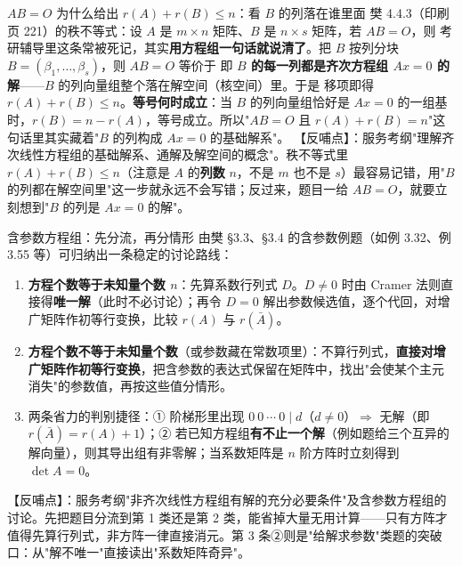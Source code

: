 \begin{fdeep}{$AB=O$ 为什么给出 $r(A)+r(B)\le n$：看 $B$ 的列落在谁里面}
樊 4.4.3（印刷页 221）的秩不等式：设 $A$ 是 $m\times n$ 矩阵、$B$ 是 $n\times s$ 矩阵，若 $AB=O$，则
考研辅导里这条常被死记，其实\textbf{用方程组一句话就说清了}。把 $B$ 按列分块 $B=(\beta_1,\dots,\beta_s)$，则 $AB=O$ 等价于
即 \textbf{$B$ 的每一列都是齐次方程组 $Ax=0$ 的解}——$B$ 的列向量组整个落在解空间（核空间）里。于是
移项即得 $r(A)+r(B)\le n$。\textbf{等号何时成立}：当 $B$ 的列向量组恰好是 $Ax=0$ 的一组基时，$r(B)=n-r(A)$，等号成立。所以"$AB=O$ 且 $r(A)+r(B)=n$"这句话里其实藏着"$B$ 的列构成 $Ax=0$ 的基础解系"。
【反哺点】：服务考纲"理解齐次线性方程组的基础解系、通解及解空间的概念"。秩不等式里 $r(A)+r(B)\le n$（注意是 $A$ 的\textbf{列数} $n$，不是 $m$ 也不是 $s$）最容易记错，用"$B$ 的列都在解空间里"这一步就永远不会写错；反过来，题目一给 $AB=O$，就要立刻想到"$B$ 的列是 $Ax=0$ 的解"。
\end{fdeep}

\begin{fdeep}{含参数方程组：先分流，再分情形}
由樊 §3.3、§3.4 的含参数例题（如例 3.32、例 3.55 等）可归纳出一条稳定的讨论路线：
\begin{enumerate}[leftmargin=2.2em,itemsep=0.25em]
\item \textbf{方程个数等于未知量个数 $n$}：先算系数行列式 $D$。$D\ne0$ 时由 Cramer 法则直接得\textbf{唯一解}（此时不必讨论）；再令 $D=0$ 解出参数候选值，逐个代回，对增广矩阵作初等行变换，比较 $r(A)$ 与 $r(\bar A)$。
\item \textbf{方程个数不等于未知量个数}（或参数藏在常数项里）：不算行列式，\textbf{直接对增广矩阵作初等行变换}，把含参数的表达式保留在矩阵中，找出"会使某个主元消失"的参数值，再按这些值分情形。
\item 两条省力的判别捷径：① 阶梯形里出现 $0\ 0\ \cdots\ 0\mid d$（$d\ne0$）$\Longrightarrow$ 无解（即 $r(\bar A)=r(A)+1$）；② 若已知方程组\textbf{有不止一个解}（例如题给三个互异的解向量），则其导出组有非零解；当系数矩阵是 $n$ 阶方阵时立刻得到 $\det A=0$。
\end{enumerate}
【反哺点】：服务考纲"非齐次线性方程组有解的充分必要条件"及含参数方程组的讨论。先把题目分流到第 1 类还是第 2 类，能省掉大量无用计算——只有方阵才值得先算行列式，非方阵一律直接消元。第 3 条②则是"给解求参数"类题的突破口：从"解不唯一"直接读出"系数矩阵奇异"。
\end{fdeep}
